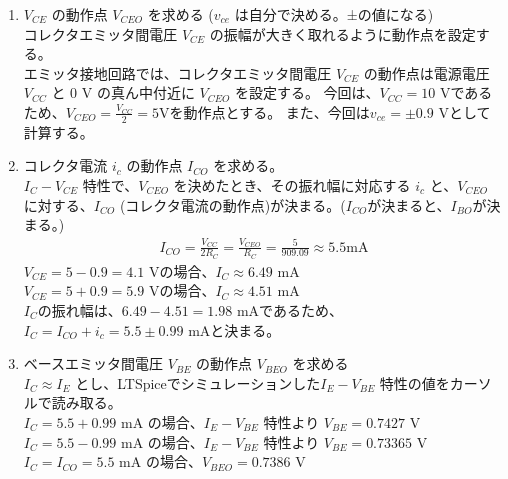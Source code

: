 \begin{enumerate}
  \item $V_{CE}$ の動作点 $V_{CEO}$ を求める ($v_{ce}$ は自分で決める。±の値になる)\\
  コレクタエミッタ間電圧 $V_{CE}$ の振幅が大きく取れるように動作点を設定する。\\
  エミッタ接地回路では、コレクタエミッタ間電圧 $V_{CE}$ の動作点は電源電圧 $V_{CC}$ と 0 V
  の真ん中付近に $V_{CEO}$ を設定する。
  今回は、$V_{CC} = 10$ Vであるため、$V_{CEO} = \frac{V_{CC}}{2} = 5\textrm{V}$を動作点とする。
  また、今回は$v_{ce} = \pm 0.9$ Vとして計算する。
  \item コレクタ電流 $i_c$ の動作点 $I_{CO}$ を求める。\\
  $I_C-V_{CE}$ 特性で、$V_{CEO}$ を決めたとき、その振れ幅に対応する $i_c$ と、$V_{CEO}$ に対する、$I_{CO}$ (コレクタ電流の動作点)が決まる。($I_{CO}$が決まると、$I_{BO}$が決まる。)
  \begin{align}
    I_{CO} = \frac{V_{CC}}{2R_C} = \frac{V_{CEO}}{R_C} = \frac{5}{909.09} \approx 5.5 \textrm{mA}    
  \end{align}
  $V_{CE} = 5 - 0.9 = 4.1$ Vの場合、$I_C \approx 6.49$ mA\\
  $V_{CE} = 5 +0.9 = 5.9$ Vの場合、$I_C \approx 4.51$ mA\\
  $I_C$の振れ幅は、$6.49 - 4.51 = 1.98$ mAであるため、
  $I_C = I_{CO}+i_c = 5.5 \pm 0.99$ mAと決まる。
  \item ベースエミッタ間電圧 $V_{BE}$ の動作点 $V_{BEO}$ を求める\\
  $I_C \approx I_E$ とし、LTSpiceでシミュレーションした$I_E-V_{BE}$ 特性の値をカーソルで読み取る。\\
  $I_C = 5.5 + 0.99$ mA の場合、$I_E-V_{BE}$ 特性より $V_{BE} = 0.7427$ V\\
  $I_C = 5.5 - 0.99$ mA の場合、$I_E-V_{BE}$ 特性より $V_{BE} = 0.73365$ V\\
  $I_C = I_{CO} = 5.5$ mA の場合、$V_{BEO} = 0.7386$ V
\end{enumerate}